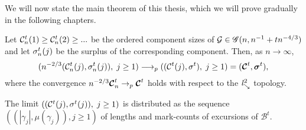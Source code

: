 We will now state the main theorem of this thesis, which we will prove gradually in the following chapters.
\begin{theorem} \label{T: Main}
	Let 
	$\mathcal{C}^t_n(1) \geq \mathcal{C}^t_n(2) \geq ... $ 
	be the ordered component sizes of 
	$\mathcal{G} \in \mathscr{G}(n, n^{-1} + tn^{-4/3})$
	and let
	$\mathcal{\sigma}^t_n(j)$ 
	be the surplus of the corresponding component.
	Then, as $n \longrightarrow \infty$,
	\begin{equation}
	( n^{-2 / 3} ( \mathcal{C}^t_n(j), \mathcal{\sigma}^t_n(j) ), \; j \geq 1 ) 
	\longrightarrow_p
	( (\mathcal{C}^t(j), \mathcal{\sigma}^t), \; j \geq 1 )
	= ( \boldsymbol{\mathcal{C}}^t, \boldsymbol{\mathcal{\sigma}}^t ),
	\end{equation}
	where the convergence 
	$n^{-2 / 3} \boldsymbol{\mathcal{C}}^t_n \rightarrow_p \boldsymbol{\mathcal{C}}^t$
	holds with respect to the $\mathit{l}^2_{\searrow}$ topology.
	
	The limit
	$\left( ( \mathcal{C}^t(j), \mathcal{\sigma}^t(j) ), \; j \geq 1 \right)$
	is distributed as the sequence
	$ \left( (|\gamma_j|, \mu(\gamma_j)), j \geq 1  \right) $
	of lengths and mark-counts of excursions of $\mathcal{B}^t$.
\end{theorem}